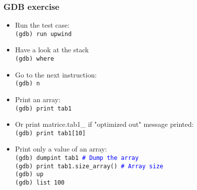 \documentclass[10pt, hyperref={unicode=true,pdfusetitle, bookmarks=true,bookmarksnumbered=false,bookmarksopen=false, breaklinks=false,pdfborder={0 0 1},backref=true,colorlinks=true,linkcolor=darkblue,pageanchor, urlcolor=darkblue}]{beamer}
\begin{document}
\begin{frame}
\frametitle{GDB exercise}
\begin{block}{}

\begin{itemize}
\item Run the test case:\\
\texttt{(gdb) run upwind}
\item Have a look at the stack\\
\texttt{(gdb) where}

\item Go to the next instruction:\\
\texttt{(gdb) n}

\item Print an array:\\
\texttt{(gdb) print tab1}

\item Or print matrice.tab1\_ if "optimized out" message printed:\\
\texttt{(gdb) print tab1[10]}

\item Print only a value of an array:\\
\texttt{(gdb) dumpint tab1 \textcolor{blue}{\# Dump the array}} \\
\texttt{(gdb) print tab1.size\_array() \textcolor{blue}{\# Array size}}\\
\texttt{(gdb) up}\\
\texttt{(gdb) list 100}
\end{itemize}

\end{block}
\end{frame}
\end{document}
